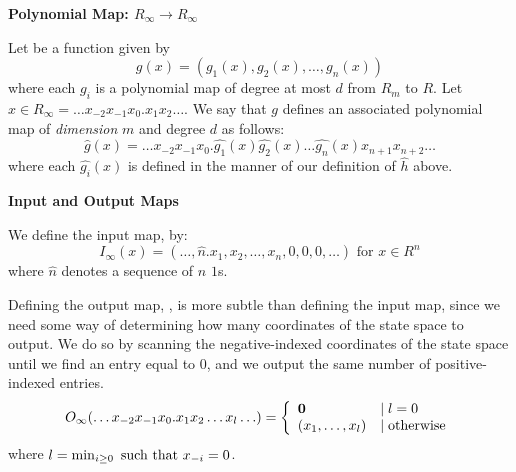   \begin{definition}{\textbf{Polynomial Map: $R_\infty \rightarrow R_\infty$}}
    
    Let  be a function given by $$g(x) =
    (g_1(x), g_2(x), \ldots , g_n(x))$$ where each $g_i$ is a
    polynomial map of degree at most $d$ from $R_m$ to $R$.  Let $x
    \in R_\infty = \ldots x_{-2}x_{-1}x_0.x_1x_2 \ldots$. We say that
    $g$ defines an associated polynomial map
     of \emph{dimension} $m$
    and degree $d$ as follows:
    $$\widehat{g}(x) = 
    \ldots x_{-2}x_{-1}x_0.
    \widehat{g_1}(x)\widehat{g_2}(x)\ldots\widehat{g_n}(x)x_{n+1}x_{n+2}\ldots$$
    where each $\widehat{g_i}(x)$ is defined in the manner of our
    definition of $\widehat{h}$ above.
  \end{definition}
  
  \begin{definition} \textbf{Input and Output Maps}
    
    We define the input map, 
    by:
    $$I_\infty(x) = 
    (\ldots, \widehat{n}.x_1,x_2,\ldots,x_n, 0,0,0,\ldots) \text{ for }
    x \in R^n$$ where $\widehat{n}$ denotes a sequence of $n$ $1$s.
    
    Defining the output map, ,
    is more subtle than defining the input map, since we need some way
    of determining how many coordinates of the state space to output.
    We do so by scanning the negative-indexed coordinates of the state
    space until we find an entry equal to $0$, and we output the same
    number of positive-indexed entries.
    $$O_\infty(\ldots x_{-2}x_{-1}x_0.x_1x_2\ldots x_l \ldots ) = 
    \left\{ \begin{array}{ll} \mathbf{0} & \mid l = 0 \\ (x_1, \ldots, x_l) & \mid \text{otherwise} \end{array} \right.
    $$
    where $l = \min_{i \geq 0} \text{ such that } x_{-i} = 0$.  
  \end{definition}

